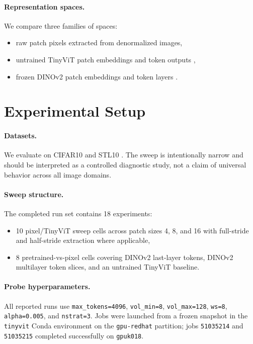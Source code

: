\documentclass{article}
\newcommand{\dataset}[1]{\textsc{#1}}
\begin{document}
\paragraph{Representation spaces.}
We compare three families of spaces:
\begin{itemize}[leftmargin=1.5em]
\item raw patch pixels extracted from denormalized images,
\item untrained TinyViT patch embeddings and token outputs \citep{wu2022tinyvit},
\item frozen DINOv2 patch embeddings and token layers \citep{oquab2023dinov2}.
\end{itemize}

\section{Experimental Setup}
\paragraph{Datasets.}
We evaluate on \dataset{CIFAR10} \citep{krizhevsky2009learning} and \dataset{STL10} \citep{coates2011analysis}. The sweep is intentionally narrow and should be interpreted as a controlled diagnostic study, not a claim of universal behavior across all image domains.

\paragraph{Sweep structure.}
The completed run set contains 18 experiments:
\begin{itemize}[leftmargin=1.5em]
\item 10 pixel/TinyViT sweep cells across patch sizes 4, 8, and 16 with full-stride and half-stride extraction where applicable,
\item 8 pretrained-vs-pixel cells covering DINOv2 last-layer tokens, DINOv2 multilayer token slices, and an untrained TinyViT baseline.
\end{itemize}

\paragraph{Probe hyperparameters.}
All reported runs use \texttt{max\_tokens=4096}, \texttt{vol\_min=8}, \texttt{vol\_max=128}, \texttt{ws=8}, \texttt{alpha=0.005}, and \texttt{nstrat=3}. Jobs were launched from a frozen snapshot in the \texttt{tinyvit} Conda environment on the \texttt{gpu-redhat} partition; jobs \texttt{51035214} and \texttt{51035215} completed successfully on \texttt{gpuk018}.
\end{document}
